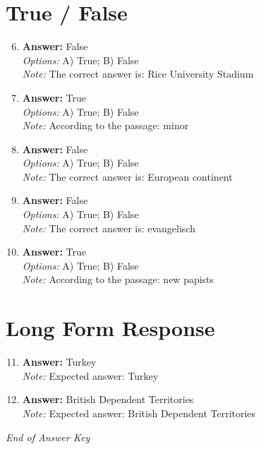 \documentclass[12pt]{article}
\begin{document}
\section*{True / False}
\begin{enumerate}[label=\arabic*.]
\setcounter{enumi}{5}
\item \textbf{Answer:} False
\\ \textit{Options:} A) True; B) False
\\ \textit{Note:} The correct answer is: Rice University Stadium
\item \textbf{Answer:} True
\\ \textit{Options:} A) True; B) False
\\ \textit{Note:} According to the passage: minor
\item \textbf{Answer:} False
\\ \textit{Options:} A) True; B) False
\\ \textit{Note:} The correct answer is: European continent
\item \textbf{Answer:} False
\\ \textit{Options:} A) True; B) False
\\ \textit{Note:} The correct answer is: evangelisch
\item \textbf{Answer:} True
\\ \textit{Options:} A) True; B) False
\\ \textit{Note:} According to the passage: new papists
\end{enumerate}

\section*{Long Form Response}
\begin{enumerate}[label=\arabic*.]
\setcounter{enumi}{10}
\item \textbf{Answer:} Turkey
\\ \textit{Note:} Expected answer: Turkey
\item \textbf{Answer:} British Dependent Territories
\\ \textit{Note:} Expected answer: British Dependent Territories
\end{enumerate}

\vfill
\noindent\textit{End of Answer Key}
\end{document}
